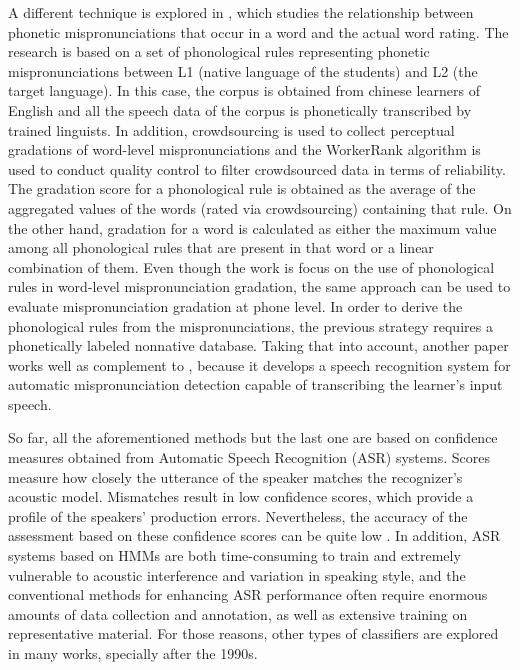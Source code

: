 A different technique is explored in \cite{phonological_rules}, which
studies the relationship between phonetic mispronunciations that occur in a word
and the actual word rating. The research is based on a set of phonological rules
representing phonetic mispronunciations between L1 (native language of the students)
and L2 (the target language). In this case, the corpus is obtained from chinese learners
of English and all the speech data of the corpus is phonetically transcribed by trained linguists.
In addition, crowdsourcing is used to collect perceptual gradations of word-level
mispronunciations and the WorkerRank algorithm is used to conduct quality control to filter
crowdsourced data in terms of reliability. The gradation score for a phonological rule
is obtained as the average of the aggregated values of the words (rated via crowdsourcing)
containing that rule. On the other hand, gradation for a word is calculated as either
the maximum value among all phonological rules that are present in
that word or a linear combination
of them. Even though the work is focus on the use of phonological rules in word-level
mispronunciation gradation, the same approach can be used to evaluate mispronunciation
gradation at phone level. In order to derive the phonological rules from the mispronunciations,
the previous strategy requires a phonetically labeled nonnative database.
Taking that into account, another paper \cite{phonological_rules_2} works well as complement
to \cite{phonological_rules}, because it develops a speech recognition system for automatic
mispronunciation detection capable of transcribing the learner's input speech.

So far, all the aforementioned methods but the last one are based on confidence measures
obtained from Automatic Speech Recognition (ASR) systems.
Scores measure how closely the utterance of the speaker matches the recognizer's
acoustic model. Mismatches result in low confidence scores, which provide a profile of the
speakers' production errors. Nevertheless, the accuracy of the assessment based on these
confidence scores can be quite low \cite{landmark_svm}.
In addition, ASR systems based on HMMs are both time-consuming to train and extremely vulnerable to
acoustic interference and variation in speaking style, and the conventional methods for
enhancing ASR performance often require enormous amounts of data collection and annotation,
as well as extensive training on representative material.
For those reasons, other types of classifiers are explored in many works, specially after
the 1990s.

